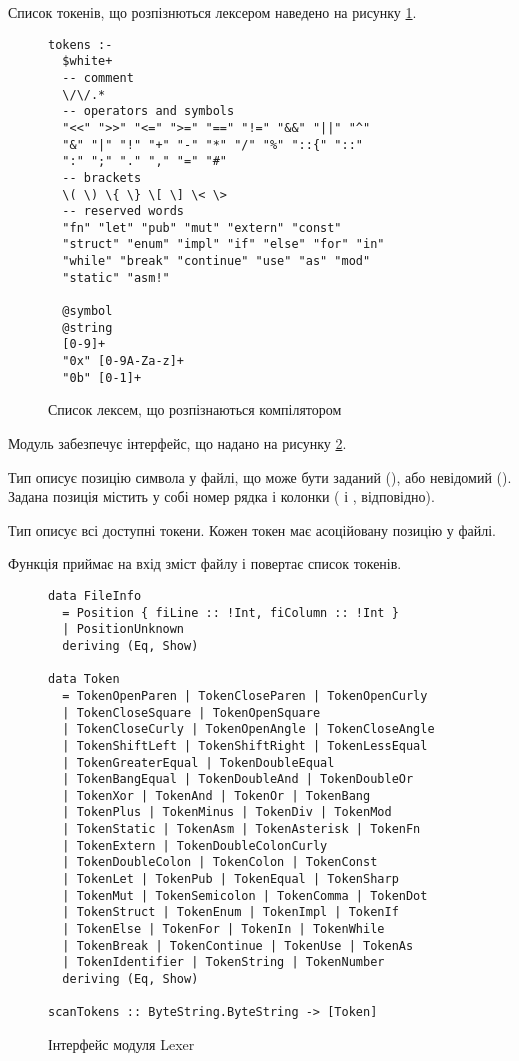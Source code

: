 \documentclass[main.tex]{subfiles}
\begin{document}
Список токенів, що розпізнються лексером наведено на рисунку \ref{compiler:lexer}.

\begin{figure}[h]
  \centering
  \begin{verbatim}
tokens :-
  $white+
  -- comment
  \/\/.*
  -- operators and symbols
  "<<" ">>" "<=" ">=" "==" "!=" "&&" "||" "^"
  "&" "|" "!" "+" "-" "*" "/" "%" "::{" "::"
  ":" ";" "." "," "=" "#"
  -- brackets
  \( \) \{ \} \[ \] \< \>
  -- reserved words
  "fn" "let" "pub" "mut" "extern" "const"
  "struct" "enum" "impl" "if" "else" "for" "in"
  "while" "break" "continue" "use" "as" "mod"
  "static" "asm!"

  @symbol
  @string
  [0-9]+
  "0x" [0-9A-Za-z]+
  "0b" [0-1]+
  \end{verbatim}
  \caption{Список лексем, що розпізнаються компілятором}
  \label{compiler:lexer}
\end{figure}

Модуль  забезпечує інтерфейс, що надано на рисунку \ref{compiler:lexer:interface}.

Тип  описує позицію символа у файлі, що може бути заданий (), або невідомий (). Задана позиція містить у собі номер рядка і колонки ( і , відповідно).

Тип  описує всі доступні токени. Кожен токен має асоційовану позицію у файлі.

Функція  приймає на вхід зміст файлу і повертає список токенів.

\begin{figure}[h]
  \centering
  \begin{verbatim}
data FileInfo
  = Position { fiLine :: !Int, fiColumn :: !Int }
  | PositionUnknown
  deriving (Eq, Show)

data Token
  = TokenOpenParen | TokenCloseParen | TokenOpenCurly
  | TokenCloseSquare | TokenOpenSquare
  | TokenCloseCurly | TokenOpenAngle | TokenCloseAngle
  | TokenShiftLeft | TokenShiftRight | TokenLessEqual
  | TokenGreaterEqual | TokenDoubleEqual
  | TokenBangEqual | TokenDoubleAnd | TokenDoubleOr
  | TokenXor | TokenAnd | TokenOr | TokenBang
  | TokenPlus | TokenMinus | TokenDiv | TokenMod
  | TokenStatic | TokenAsm | TokenAsterisk | TokenFn
  | TokenExtern | TokenDoubleColonCurly
  | TokenDoubleColon | TokenColon | TokenConst
  | TokenLet | TokenPub | TokenEqual | TokenSharp
  | TokenMut | TokenSemicolon | TokenComma | TokenDot
  | TokenStruct | TokenEnum | TokenImpl | TokenIf
  | TokenElse | TokenFor | TokenIn | TokenWhile
  | TokenBreak | TokenContinue | TokenUse | TokenAs
  | TokenIdentifier | TokenString | TokenNumber
  deriving (Eq, Show)

scanTokens :: ByteString.ByteString -> [Token]
  \end{verbatim}
  \caption{Інтерфейс модуля Lexer}
  \label{compiler:lexer:interface}
\end{figure}
\end{document}
